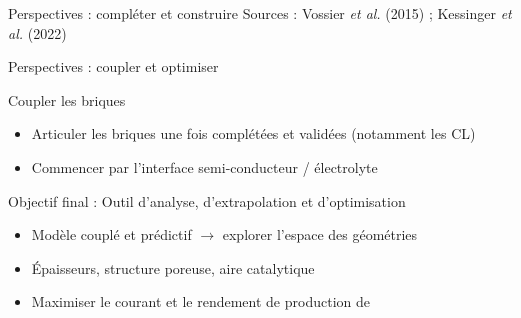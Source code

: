 \begin{frame}[t]{Perspectives : compléter et construire}
  {\tiny\color{pcNavy!60} Sources : Vossier \textit{et al.} (2015) ; Kessinger \textit{et al.} (2022)}
\end{frame}
\begin{frame}[t]{Perspectives : coupler et optimiser}
  \vspace{0.4em}

  \begin{pcbanner}{Coupler les briques}
    \begin{itemize}\footnotesize
      \item Articuler les briques une fois complétées et validées (notamment les CL)
      \item Commencer par l'interface semi-conducteur / électrolyte
    \end{itemize}
  \end{pcbanner}

  \vspace{0.8em}

  \begin{pcbanner}{Objectif final : Outil d'analyse, d'extrapolation et d'optimisation}
    \begin{itemize}\footnotesize
      \item Modèle couplé et prédictif $\rightarrow$ explorer l'espace des géométries
      \item Épaisseurs, structure poreuse, aire catalytique
      \item Maximiser le courant et le rendement de production de 
    \end{itemize}
  \end{pcbanner}
\end{frame}


